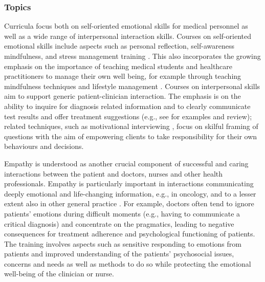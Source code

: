 \documentclass[prodmode,acmtochi]{acmsmall}
\newcommand{\GeraldineFIXNEW}[1]{}
\begin{document}
\subsubsection*{Topics} 
Curricula focus both on self-oriented emotional skills for medical personnel as well as a wide range of interpersonal interaction skills. 
%
Courses on self-oriented emotional skills include aspects such as personal reflection, self-awareness mindfulness, and stress management training \cite{Shapiro2000,Epstein1999,Satterfield2007}. This also incorporates the growing emphasis on the importance of teaching medical students and healthcare practitioners to manage their own well being, for example through teaching mindfulness techniques and lifestyle management \cite{Hassed2009}.
%
Courses on interpersonal skills aim to support generic patient-clinician interaction. The emphasis is on the ability to inquire for diagnosis related information and to clearly communicate test results and offer  treatment suggestions (e.g., see \cite{Kalet2004,Barth2011} for examples and review); related techniques, such as  motivational interviewing \cite{Miller2002},  focus on skilful framing of questions with the aim of empowering  clients to take responsibility for their own behaviours and decisions.  
\GeraldineFIXNEW{GF NOTE: Hettema is not a classic motivational interviewing ref - some Miller ref is better to use here eg Miller, W. R., \& Rollnick, S. (1991). Motivational interviewing: Preparing people for change. New York: Guilford Press. OR Rollnick, S., \& Miller, W.R. (1995). What is motivational interviewing? Behavioural and Cognitive Psychotherapy, 23, 325-334.}
%
 
Empathy is understood as another crucial component of successful and caring interactions between the patient and doctors, nurses and other health professionals. Empathy is particularly important in interactions communicating deeply emotional and life-changing information, e.g., in oncology, and to a lesser extent also in other general practice \cite{Barth2011}.
                For example, doctors often tend to ignore patients' emotions during difficult moments (e.g., having to communicate a critical diagnosis) and concentrate on the pragmatics, leading to negative consequences for treatment adherence and psychological functioning of patients. The training involves aspects such as sensitive responding to emotions from patients and improved understanding of the patients' psychosocial issues, concerns and needs as well as methods to do so while protecting the emotional well-being of the clinician or nurse. 
\end{document}
